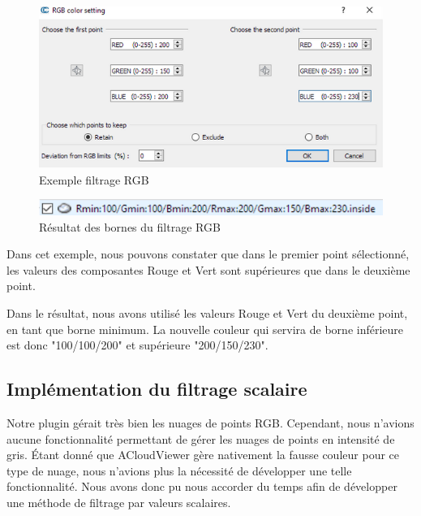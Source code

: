 \documentclass[12pt,titlepage,french]{article}
\begin{document}
\begin{figure}[H]
 \caption{\label{} Exemple filtrage RGB}
 \begin{center}
 \includegraphics[width=1\textwidth]{./img/rgb_ui.PNG}
  \end{center}
\end{figure}

\begin{figure}[H]
 \caption{\label{} Résultat des bornes du filtrage RGB}
 \begin{center}
 \includegraphics[width=1\textwidth]{./img/rgb_res.PNG}
  \end{center}
\end{figure}

Dans cet exemple, nous pouvons constater que dans le premier point sélectionné, les valeurs des composantes Rouge et Vert sont supérieures que dans le deuxième point. \newline

Dans le résultat, nous avons utilisé les valeurs Rouge et Vert du deuxième point, en tant que borne minimum. La nouvelle couleur qui servira de borne inférieure est donc "100/100/200" et supérieure "200/150/230".

\subsection{Implémentation du filtrage scalaire}

Notre plugin gérait très bien les nuages de points RGB. Cependant, nous n'avions aucune fonctionnalité permettant de gérer les nuages de points en intensité de gris. Étant donné que ACloudViewer gère nativement la fausse couleur pour ce type de nuage, nous n'avions plus la nécessité de développer une telle fonctionnalité. Nous avons donc pu nous accorder du temps afin de développer une méthode de filtrage par valeurs scalaires. \newline
\end{document}
